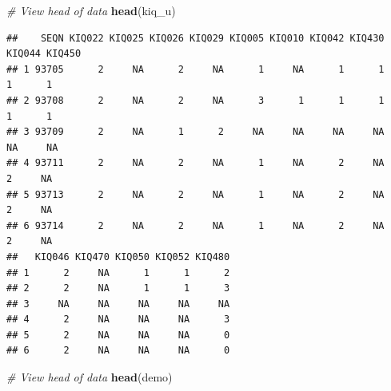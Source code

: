 \documentclass[
]{article}
\newenvironment{Shaded}{\begin{snugshade}}{\end{snugshade}}
\newcommand{\CommentTok}[1]{\textcolor[rgb]{0.56,0.35,0.01}{\textit{#1}}}
\newcommand{\FunctionTok}[1]{\textcolor[rgb]{0.13,0.29,0.53}{\textbf{#1}}}
\newcommand{\NormalTok}[1]{#1}
\begin{document}
\begin{Shaded}
\begin{Highlighting}[]
\CommentTok{\# View head of data}
\FunctionTok{head}\NormalTok{(kiq\_u)}
\end{Highlighting}
\end{Shaded}

\begin{verbatim}
##    SEQN KIQ022 KIQ025 KIQ026 KIQ029 KIQ005 KIQ010 KIQ042 KIQ430 KIQ044 KIQ450
## 1 93705      2     NA      2     NA      1     NA      1      1      1      1
## 2 93708      2     NA      2     NA      3      1      1      1      1      1
## 3 93709      2     NA      1      2     NA     NA     NA     NA     NA     NA
## 4 93711      2     NA      2     NA      1     NA      2     NA      2     NA
## 5 93713      2     NA      2     NA      1     NA      2     NA      2     NA
## 6 93714      2     NA      2     NA      1     NA      2     NA      2     NA
##   KIQ046 KIQ470 KIQ050 KIQ052 KIQ480
## 1      2     NA      1      1      2
## 2      2     NA      1      1      3
## 3     NA     NA     NA     NA     NA
## 4      2     NA     NA     NA      3
## 5      2     NA     NA     NA      0
## 6      2     NA     NA     NA      0
\end{verbatim}

\begin{Shaded}
\begin{Highlighting}[]
\CommentTok{\# View head of data}
\FunctionTok{head}\NormalTok{(demo)}
\end{Highlighting}
\end{Shaded}
\end{document}
